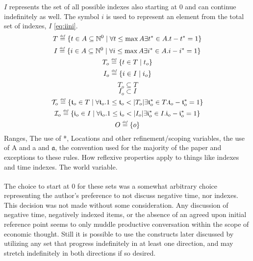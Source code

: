 \documentclass[]{article}
\newcommand{\defeq}{\stackrel{\smash{\scriptscriptstyle\mathit{def}}}{=}}
\begin{document}
$I$ represents the set of all possible indexes also starting at $0$ and can continue indefinitely as well. The symbol $i$ is used to represent an element from the total set of indexes, $I$ \eqref{eq:iini}. 
%
\begin{equation} \label{eq:global_time} 
T \defeq \{ t \in A \subseteq \mathbb{N}^{0} \mid \forall t \leq \max A\exists t^{*} \in A.t-t^{*}=1 \} 
\end{equation}
\begin{equation} \label {eq:global_identity}
I \defeq \{ i \in A \subseteq \mathbb{N}^{0} \mid \forall i \leq \max A\exists i^{*} \in A.i-i^{*}=1 \}
\end{equation}
\begin{equation} \label{eq:object_time}
T_{o} \defeq \{ t \in T \mid t_{o} \}
\end{equation}
\begin{equation} \label {eq:object_identity}
I_{o} \defeq \{ i \in I \mid i_{o} \}
\end{equation}
\begin{equation} \label{eq:subset_global_time}
T_{o} \subseteq T
\end{equation}
\begin{equation} \label {eq:subset_global_identity}
I_{o} \subset I
\end{equation}
\begin{equation} \label{eq:relative_object_time} 
\mathcal{T}_{o} \defeq \{ \mathfrak{t}_{o} \in T \mid \forall \mathfrak{t}_{o}.1 \leq \mathfrak{t}_{o}  < |T_{o}| \exists \mathfrak{t}^{*}_{o} \in T.\mathfrak{t}_{o}-\mathfrak{t}^{*}_{o}=1 \} 
\end{equation}
\begin{equation} \label{eq:relative_object_identity}
\mathcal{I}_{o} \defeq \{ \mathfrak{i}_{o} \in I \mid \forall \mathfrak{i}_{o}.1 \leq \mathfrak{i}_{o} < |I_{o}| \exists \mathfrak{i}^{*}_{o} \in I.\mathfrak{i}_{o}-\mathfrak{i}^{*}_{o}=1 \} 
\end{equation}
\begin{equation} \label{eq:object}
O \defeq \{ o \}
\end{equation}
%
Ranges, The use of *, Locations and other refinement/scoping variables, the use of A and a and $\mathfrak{a}$, the convention used for the majority of the paper and exceptions to these rules. How reflexive properties apply to things like indexes and time indexes. The world variable. 
\\
\\
The choice to start at $0$ for these sets was a somewhat arbitrary choice representing the author's preference to not discuss negative time, nor indexes. This decision was not made without some consideration. Any discussion of negative time, negatively indexed items, or the absence of an agreed upon initial reference point seems to only muddle productive conversation within the scope of economic thought. Still it is possible to use the constructs later discussed by utilizing any set that progress indefinitely in at least one direction, and may stretch indefinitely in both directions if so desired. 
%
\end{document}

